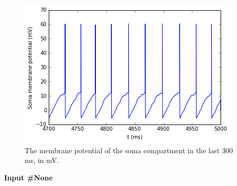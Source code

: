 \documentclass{article}
\makeatletter
\def\maxwidth{\ifdim\Gin@nat@width>\linewidth\linewidth
    \else\Gin@nat@width\fi}
\let\Oldincludegraphics\includegraphics
\renewcommand{\includegraphics}[1]{\Oldincludegraphics[width=.8\maxwidth]{#1}}
\makeatother
\begin{document}
    \begin{figure}
        \begin{center}
        \includegraphics{MNPoolWithDescendingCommand_files/MNPoolWithDescendingCommand_22_1.png}
        \end{center}
        \caption{The membrane potential of the soma compartment in the last 300 ms, in mV.}
        \label{fig:somaVLast}
    \end{figure}
    \newline\textbf{Input \#{}None}\begin{verbatim}

\end{verbatim}

    
    
    
    
\end{document}
